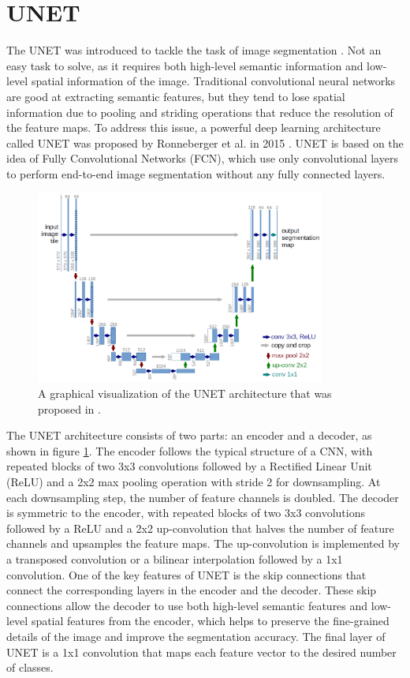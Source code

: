 \section{UNET}
\label{sec:unet}
The UNET was introduced to tackle the task of image segmentation \cite{ronneberger_unet}. Not an easy task to solve, as it requires 
both high-level semantic information and low-level spatial information of the image.
Traditional convolutional neural networks are good at extracting semantic features, but they tend to lose spatial information due to pooling 
and striding operations that reduce the resolution of the feature maps.
To address this issue, a powerful deep learning architecture called UNET was proposed by Ronneberger et al. in 2015 . 
UNET is based on the idea of Fully Convolutional Networks (FCN), which use only convolutional layers to perform end-to-end 
image segmentation without any fully connected layers. \newline
\begin{figure}
    \centering
    \includegraphics[width=0.85\textwidth]{images/u-net-architecture.png}
    \caption{A graphical visualization of the UNET architecture that was proposed in \cite{ronneberger_unet}.}
    \label{fig:unet}
\end{figure}
The UNET architecture consists of two parts: an encoder and a decoder, as shown in figure \ref{fig:unet}. 
The encoder follows the typical structure of a CNN, with repeated blocks of two 3x3 convolutions followed by 
a Rectified Linear Unit (ReLU) and a 2x2 max pooling operation with stride 2 for downsampling. At each 
downsampling step, the number of feature channels is doubled. \newline
The decoder is symmetric to the encoder, with repeated blocks of two 3x3 convolutions followed by a ReLU and 
a 2x2 up-convolution that halves the number of feature channels and upsamples the feature maps. The up-convolution is implemented by a 
transposed convolution or a bilinear interpolation followed by a 1x1 convolution.
One of the key features of UNET is the skip connections that connect the corresponding layers in the encoder 
and the decoder. These skip connections allow the decoder to use both high-level semantic features and 
low-level spatial features from the encoder, which helps to preserve the fine-grained details of the image 
and improve the segmentation accuracy.\newline
The final layer of UNET is a 1x1 convolution that maps each feature vector to the desired number of classes.
